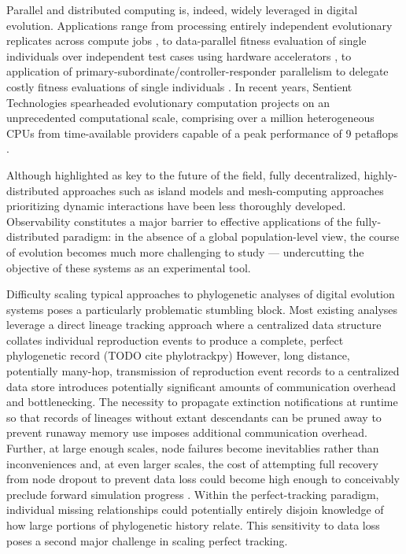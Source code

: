 Parallel and distributed computing is, indeed, widely leveraged in digital evolution.
Applications range from processing entirely independent evolutionary replicates across compute jobs \citep{dolson2017spatial, hornby2006automated}, to data-parallel fitness evaluation of single individuals over independent test cases using hardware accelerators \citep{harding2007fast_springer, langdon2019continuous}, to application of primary-subordinate/controller-responder parallelism to delegate costly fitness evaluations of single individuals \citep{cantu2001master,miikkulainen2019evolving}.
In recent years, Sentient Technologies spearheaded evolutionary computation projects on an unprecedented computational scale, comprising over a million heterogeneous CPUs from time-available providers capable of a peak performance of 9 petaflops \citep{miikkulainen2019evolving,gilbert2015artificial,blondeau2009distributed}.

Although highlighted as key to the future of the field, fully decentralized, highly-distributed approaches such as island models \citep{bennett1999building,schulte2010genetic} and mesh-computing approaches prioritizing dynamic interactions \citep{ray1995proposal,ackley2018digital,moreno2021conduit} have been less thoroughly developed.
Observability constitutes a major barrier to effective applications of the fully-distributed paradigm: in the absence of a global population-level view, the course of evolution becomes much more challenging to study --- undercutting the objective of these systems as an experimental tool.

Difficulty scaling typical approaches to phylogenetic analyses of digital evolution systems poses a particularly problematic stumbling block.
Most existing analyses leverage a direct lineage tracking approach where a centralized data structure collates individual reproduction events to produce a complete, perfect phylogenetic record (TODO cite phylotrackpy)
However, long distance, potentially many-hop, transmission of reproduction event records to a centralized data store introduces potentially significant amounts of communication overhead and bottlenecking.
The necessity to propagate extinction notifications at runtime so that records of lineages without extant descendants can be pruned away to prevent runaway memory use imposes additional communication overhead.
Further, at large enough scales, node failures become inevitablies rather than inconveniences and, at even larger scales, the cost of attempting full recovery from node dropout to prevent data loss could become high enough to conceivably preclude forward simulation progress \citep{cappello2014toward}.
Within the perfect-tracking paradigm, individual missing relationships could potentially entirely disjoin knowledge of how large portions of phylogenetic history relate.
This sensitivity to data loss poses a second major challenge in scaling perfect tracking.

